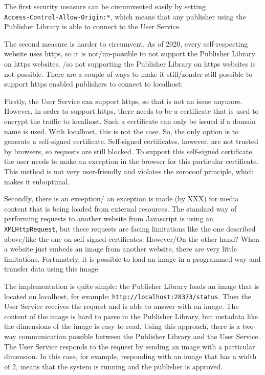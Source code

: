 The first security measure can be circumvented easily by setting \\\texttt{Access-Control-Allow-Origin:*}, which means that any publisher using the Publisher Library is able to connect to the User Service. 

The second measure is harder to circumvent. As of 2020, every self-respecting website uses https, so it is not/im-possible to not support the Publisher Library on https websites. /so not supporting the Publisher Library on https websites is not possible. There are a couple of ways to make it still/zonder still possible to support https enabled publishers to connect to localhost:

 
Firstly, the User Service can support https, so that is not an issue anymore. However, in order to support https, there needs to be a certificate that is used to encrypt the traffic to localhost. Such a certificate can only be issued if a domain name is used. With localhost, this is not the case. So, the only option is to generate a self-signed certificate. Self-signed certificates, however, are not trusted by browsers, so requests are still blocked. To support this self-signed certificate, the user needs to make an exception in the browser for this particular certificate. This method is not very user-friendly and violates the zeroconf principle, which makes it suboptimal.

Secondly, there is an exception/ an exception is made (by XXX) for media content that is being loaded from external resources. The standard way of performing requests to another website from Javascript is using an \texttt{XMLHttpRequest}, but these requests are facing limitations like the one described above/like the one on self-signed certificates. However/On the other hand? When a website just embeds an image from another website, there are very little limitations. Fortunately, it is possible to load an image in a programmed way and transfer data using this image.

The implementation is quite simple: the Publisher Library loads an image that is located on localhost, for example: \texttt{http://localhost:28373/status}. Then the User Service receives the request and is able to answer with an image. The content of the image is hard to parse in the Publisher Library, but metadata like the dimensions of the image is easy to read. Using this approach, there is a two-way communication possible between the Publisher Library and the User Service. The User Service responds to the request by sending an image with a particular dimension. In this case, for example, responding with an image that has a width of 2, means that the system is running and the publisher is approved.

